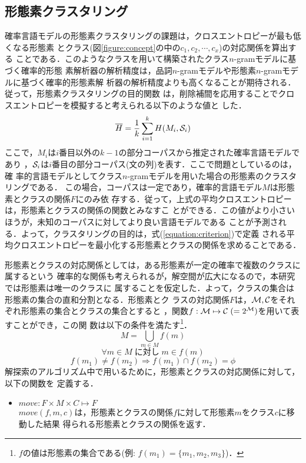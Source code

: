 \subsection{形態素クラスタリング}

確率言語モデルの形態素クラスタリングの課題は，クロスエントロピーが最も低くなる形態素
とクラス(図\ref{figure:concept}の中の$c_{1},c_{2},\cdots,c_{x}$)の対応関係を算出する
ことである．このようなクラスを用いて構築されたクラス$n$-gramモデルに基づく確率的形態
素解析器の解析精度は，品詞$n$-gramモデルや形態素$n$-gramモデルに基づく確率的形態素解
析器の解析精度よりも高くなることが期待される．従って，形態素クラスタリングの目的関数
は，削除補間を応用することでクロスエントロピーを模擬すると考えられる以下のような値と
した．
\begin{equation}
  \label{equation:criterion}
  \overline{H} = \frac{1}{k}\sum_{i=1}^{k} H(M_{i},{\cal S}_{i})
\end{equation}
ここで，$M_{i}$は$i$番目以外の$k-1$の部分コーパスから推定された確率言語モデルであり
，${\cal S}_{i}$は$i$番目の部分コーパス(文の列)を表す．ここで問題としているのは，確
率的言語モデルとしてクラス$n$-gramモデルを用いた場合の形態素のクラスタリングである．
この場合，コーパスは一定であり，確率的言語モデル$M$は形態素とクラスの関係$F$にのみ依
存する．従って，上式の平均クロスエントロピーは，形態素とクラスの関係の関数とみなすこ
とができる．この値がより小さいほうが，未知のコーパスに対してより良い言語モデルである
ことが予測される．よって，クラスタリングの目的は，式(\ref{equation:criterion})で定義
される平均クロスエントロピーを最小化する形態素とクラスの関係を求めることである．



形態素とクラスの対応関係としては，ある形態素が一定の確率で複数のクラスに属するという
確率的な関係も考えられるが，解空間が広大になるので，本研究では形態素は唯一のクラスに
属することを仮定した．よって，クラスの集合は形態素の集合の直和分割となる．形態素とク
ラスの対応関係$F$は，${\cal M},{\cal C}$をそれぞれ形態素の集合とクラスの集合とすると
，関数$f : {\cal M} \mapsto {\cal C} \;(= 2^{\cal M})$を用いて表すことができ，この関
数は以下の条件を満たす\footnote{$f$の値は形態素の集合である(例: $f(m_{1}) = \{m_{1},
m_ {2}, m_{3}\}$)．}．
\begin{displaymath}
  M = \bigcup_{m \in M} f(m)  
\end{displaymath}
\begin{displaymath}
  \forall m \in M \; に対し \; m \in f(m)
\end{displaymath}
\begin{displaymath}
  f(m_{1}) \not = f(m_{2}) \Rightarrow f(m_{1}) \cap f(m_{2}) = \phi  
\end{displaymath}
解探索のアルゴリズム中で用いるために，形態素とクラスの対応関係に対して，以下の関数を
定義する．
\begin{itemize}
\item $move : F \times M \times C \mapsto F$ \\
  $move(f,m,c)$は，形態素とクラスの関係$f$に対して形態素$m$をクラス$c$に移動した結果
  得られる形態素とクラスの関係を返す．
\end{itemize}

